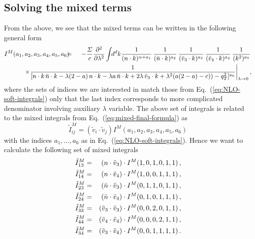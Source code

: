 \documentclass[a4paper,11pt]{report}
\numberwithin{equation}{section}
\newcommand{\mixed}{{M}}
\begin{document}
\subsection{Solving the mixed terms}

From the above, we see that the mixed terms can be written in the following
general form
%
\begin{eqnarray}
  I^\mixed (a_1,a_2,a_3,a_4,a_5, a_6)
  & \!\!\!\!=\!\!\!\!\!\! &
  - \frac{\Sigma}{c}
  \frac{\partial^2}{\partial \lambda^2}
  \int \!\! d^d k
  \frac{1}{(n\cdot k)^{\alpha+a_1}}\,
  \frac{1}{(\nbar \cdot k)^{a_2}}\,
  \frac{1}{(\tilde v_3 \cdot k)^{a_3}}\,
  \frac{1}{(\tilde v_4 \cdot k)^{a_4}}\,
  \frac{1}{(k^2)^{a_5}}\,
  \label{eq:mixed-topology}
  \\
  & & 
  \hspace{-80pt}
  \times
  \frac{1}{[ n \cdot k\, \nbar \cdot k
  - \lambda (2-a)\, n\cdot k - \lambda a\, \nbar \cdot k
  + 2 \lambda\, \tilde v_3 \cdot k + \lambda^2 (a(2-a)-c)) - q_T^2]^{a_6}}
  \bigg |_{\lambda \to 0}\,,
  \nonumber 
\end{eqnarray}
%
where the sets of indices we are interested in match those from
Eq.~(\ref{eq:NLO-soft-integrals}) only that the last index corresponds to more
complicated denominator involving auxiliary $\lambda$ variable. The above set
of integrals is related to the mixed integrals from
Eq.~(\ref{eq:mixed-final-formula}) as 
%
\begin{equation}
  \tilde I_{ij}^\mixed
  = (\tilde v_i \cdot \tilde v_j)
  I^\mixed(a_1,a_2,a_3,a_4,a_5, a_6 )
\end{equation}
%
with the indices $a_1,\ldots, a_6$ as in Eq.~(\ref{eq:NLO-soft-integrals}).
Hence we want to calculate the following set of mixed integrals 
%
\begin{eqnarray}
  \tilde I_{13}^\mixed & = &
  (n\cdot \tilde v_3) \cdot I^\mixed(1,0,1,0,1,1)\,,
  \nonumber \\
  \tilde I_{14}^\mixed & = &
  (n\cdot \tilde v_4) \cdot I^\mixed(1,0,0,1,1,1)\,,
  \nonumber \\
  \tilde I_{23}^\mixed & = &
  (\nbar\cdot \tilde v_3) \cdot I^\mixed(0,1,1,0,1,1)\,,
  \nonumber \\
  \tilde I_{24}^\mixed & = &
  (\nbar\cdot \tilde v_4) \cdot I^\mixed(0,1,0,1,1,1)\,,
  \label{eq:mixed-soft-integrals}
  \\
  \tilde I_{33}^\mixed & = &
  (\tilde v_3 \cdot \tilde v_3) \cdot I^\mixed(0,0,2,0,1,1)\,,
  \nonumber \\
  \tilde I_{44}^\mixed & = &
  (\tilde v_4 \cdot \tilde v_4) \cdot I^\mixed(0,0,0,2,1,1)\,,
  \nonumber \\
  \tilde I_{34}^\mixed & = &
  (\tilde v_3 \cdot \tilde v_4) \cdot I^\mixed(0,0,1,1,1,1)\,.
  \nonumber
\end{eqnarray}
\end{document}
